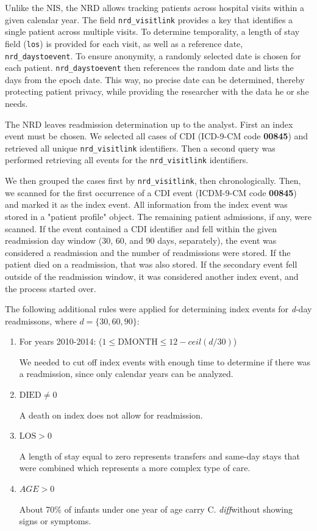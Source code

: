 \documentclass[12pt]{ociamthesis}\usepackage[]{graphicx}\usepackage[]{color}
\newcommand{\cdiff}{C. \textit{diff}}
\begin{document}
Unlike the NIS, the NRD allows tracking patients across hospital visits within a given calendar year.
The field \texttt{nrd\_visitlink} provides a key that identifies a single patient across multiple visits.
To determine temporality, a length of stay field (\texttt{los}) is provided for each visit, as well as
a reference date, \texttt{nrd\_daystoevent}. To ensure anonymity, a randomly selected date is chosen for 
each patient. \texttt{nrd\_daystoevent} then references the random date and lists the days from the epoch date.
This way, no precise date can be determined, thereby protecting patient privacy, while providing the researcher
with the data he or she needs. 

The NRD leaves readmission determination up to the analyst. First an index event must be chosen. 
We selected all cases of CDI (ICD-9-CM code \textbf{00845}) and retrieved all unique \texttt{nrd\_visitlink}
identifiers. Then a second query was performed retrieving all events for the \texttt{nrd\_visitlink} identifiers.

We then grouped the cases first by \texttt{nrd\_visitlink}, then chronologically. Then, we scanned for the first
occurrence of a CDI event (ICDM-9-CM code \textbf{00845}) and marked it as the index event. All information from
the index event was stored in a "patient profile" object. The remaining patient admissions, if any, were scanned.
If the event contained a CDI identifier and fell within the given readmission day window (30, 60, and 90 days, separately),
the event was considered a readmission and the number of readmissions were stored. If the patient died on a readmission,
that was also stored. If the secondary event fell outside of the readmission window, it was considered another index event, 
and the process started over.

The following additional rules were applied for determining index events for \textit{d}-day readmissons, where $d = \{30, 60, 90\}$:

\begin{enumerate}
    \item For years 2010-2014: ($1 \le \text{DMONTH} \le 12 - ceil(d/30)$)
    
    We needed to cut off index events with enough time to determine if there was a readmission, since only calendar years can be analyzed.
    
    \item $\text{DIED} \ne 0$
    
    A death on index does not allow for readmission.
    
    \item $\text{LOS} > 0$
    
    A length of stay equal to zero represents transfers and same-day stays that were combined which represents a more complex type of care. \cite{NRDIntroduction2013}
    
    \item $AGE > 0$
  
    About 70\% of infants under one year of age carry \cdiff without showing signs or symptoms. \cite{Lamont2017} 
    
\end{enumerate}
\end{document}
